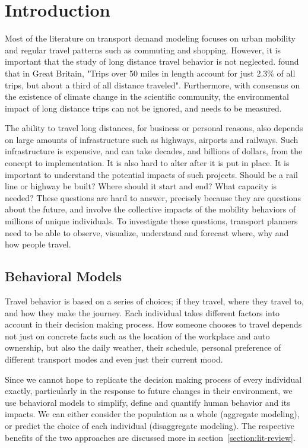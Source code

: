 \chapter{Introduction}
Most of the literature on transport demand modeling focuses on urban mobility and regular travel patterns such as commuting and shopping. However, it is important that the study of long distance travel behavior is not neglected. \textcite{rohr2010modelling} found that in Great Britain, "Trips over 50 miles in length account for just 2.3\% of all trips, but about a third of all distance traveled". Furthermore, with  consensus on the existence of climate change in the scientific community, the environmental impact of long distance trips can not be ignored, and needs to be measured. 

The ability to travel long distances, for business or personal reasons, also depends on large amounts of infrastructure such as highways, airports and railways. Such infrastructure is expensive, and can take decades, and billions of dollars, from the concept to implementation. It is also hard to alter after it is put in place. It is important to understand the potential impacts of such projects. Should be a rail line or highway be built? Where should it start and end? What capacity is needed? These questions are hard to answer, precisely because they are questions about the future, and involve the collective impacts of the mobility behaviors of millions of unique individuals. To investigate these questions, transport planners need to be able to observe, visualize, understand and forecast where, why and how people travel. 
	

\section{Behavioral Models}
Travel behavior is based on a series of choices; if they travel, where they travel to, and how they make the journey. Each individual takes different factors into account in their decision making process. How someone chooses to travel depends not just on concrete facts such as the location of the workplace and auto ownership, but also the daily weather, their schedule, personal preference of different transport modes and even just their current mood.

Since we cannot hope to replicate the decision making process of every individual exactly, particularly in the response to future changes in their environment,  we use behavioral models to simplify, define and quantify human behavior and its impacts. We can either consider the population as a whole (aggregate modeling), or predict the choice of each individual (disaggregate modeling). The respective benefits of the two approaches are discussed more in section~\ref{section:lit-review}.

